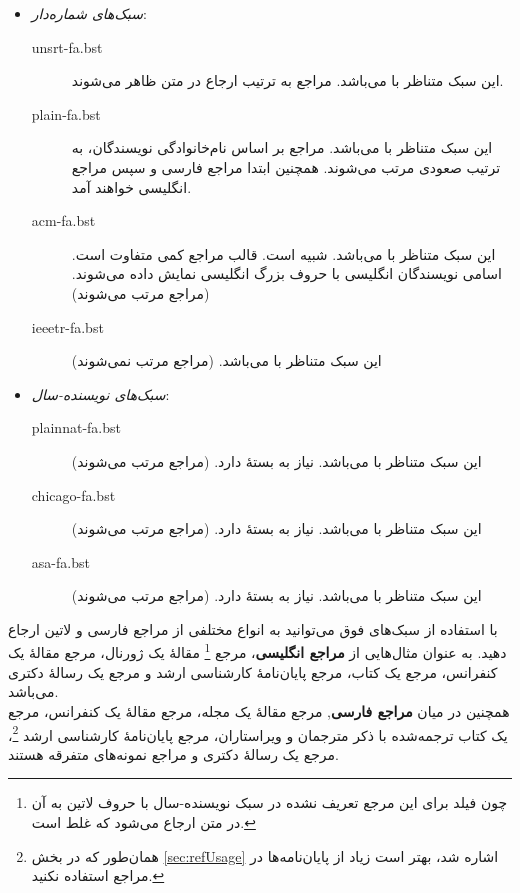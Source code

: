 \singlespacing
\begin{itemize}
\item \emph{سبک‌های شماره‌دار}:
	\begin{description}
	\item [unsrt-fa.bst] این سبک متناظر با  می‌باشد. مراجع به ترتیب ارجاع در متن ظاهر می‌شوند.
	\item [plain-fa.bst] این سبک متناظر با  می‌باشد. مراجع بر اساس نام‌خانوادگی نویسندگان، به ترتیب صعودی مرتب می‌شوند.
	 همچنین ابتدا مراجع فارسی و سپس مراجع انگلیسی خواهند آمد.
	\item [acm-fa.bst] این سبک متناظر با  می‌باشد. شبیه  است.  قالب مراجع کمی متفاوت است. اسامی نویسندگان انگلیسی با حروف بزرگ انگلیسی نمایش داده می‌شوند. (مراجع مرتب می‌شوند)
	\item [ieeetr-fa.bst] این سبک متناظر با  می‌باشد. (مراجع مرتب نمی‌شوند)
	\end{description}
	
\item \emph{سبک‌های نویسنده-سال}:
	\begin{description}
	\item [plainnat-fa.bst] این سبک متناظر با  می‌باشد. نیاز به بستهٔ  دارد. (مراجع مرتب می‌شوند)
	\item [chicago-fa.bst] این سبک متناظر با  می‌باشد. نیاز به بستهٔ  دارد. (مراجع مرتب می‌شوند)
	\item [asa-fa.bst] این سبک متناظر با  می‌باشد. نیاز به بستهٔ  دارد. (مراجع مرتب می‌شوند)
	\end{description}
\end{itemize}
\doublespacing

با استفاده از سبک‌های فوق می‌توانید به انواع مختلفی از مراجع فارسی و لاتین ارجاع دهید.
به عنوان مثال‌هایی از
\textbf{مراجع انگلیسی}،
مرجع
\cite{Baker02limits}\footnote{چون فیلد  برای این مرجع تعریف نشده در سبک نویسنده-سال با حروف لاتین به آن در متن ارجاع می‌شود که غلط است.}
مقالهٔ یک ژورنال، مرجع
\cite{Amintoosi09video}
مقالهٔ یک کنفرانس، مرجع
یک کتاب، مرجع
\cite{Khalighi07MscThesis}
پایان‌نامهٔ کارشناسی ارشد و مرجع
یک رسالهٔ دکتری می‌باشد.\\
همچنین در میان
\textbf{مراجع فارسی},
مرجع
\cite{Vahedi87}
مقالهٔ یک مجله، مرجع
\cite{Amintoosi87afzayesh}
مقالهٔ یک کنفرانس، مرجع
\cite{Pedram80osool}
یک کتاب ترجمه‌شده با ذکر مترجمان و ویراستاران، مرجع
\cite{Pourmousa88mscThesis}
پایان‌نامهٔ کارشناسی ارشد%
\footnote{همان‌طور که در بخش
\ref{sec:refUsage}
اشاره شد، بهتر است زیاد از پایان‌نامه‌ها در مراجع استفاده نکنید.}،
مرجع
\cite{Omidali82phdThesis}
یک رسالهٔ دکتری و مراجع
\cite{persianbib87userguide, Khalighi87xepersian}
نمونه‌های متفرقه هستند.

